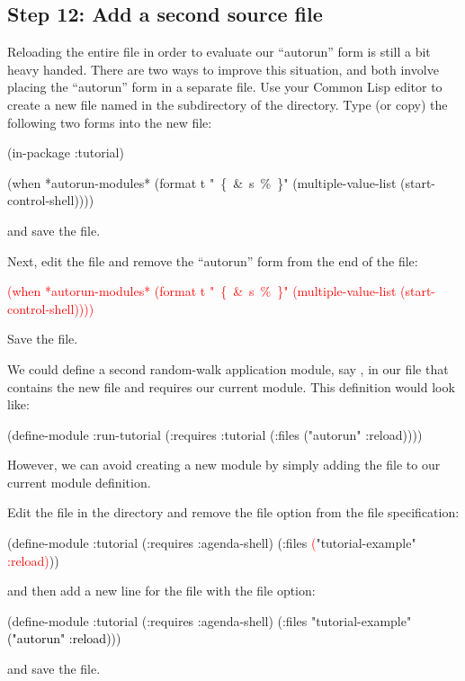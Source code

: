 \documentclass[10pt,twoside,english,pdftex]{article}
\begin{document}
\subsection*{Step 12: Add a second source file}

Reloading the entire  file in order to
evaluate our ``autorun'' form is still a bit heavy handed.  There are two ways
to improve this situation, and both involve placing the ``autorun'' form in a
separate file.  Use your Common Lisp editor to create a new file named
 in the  subdirectory of the
 directory. Type (or copy) the following two forms into the new
 file:
%
\W\supp
\begin{example}
  (in-package :tutorial)

  (when *autorun-modules*
    (format t "~\{~\&~s~\%~\}" (multiple-value-list (start-control-shell))))
\end{example}
%
and save the file.  

Next, edit the  file and remove the
``autorun'' form from the end of the file:
% 
\W\supp
\begin{example}
\textcolor{red}{%
  (when *autorun-modules* 
    (format t "~\{~\&~s~\%~\}" (multiple-value-list (start-control-shell))))}
\end{example}
%
Save the file. 

We could define a second random-walk application module, say
, in our  file that
contains the new  file and requires our current
 module.  This definition would look like:
%
\W\supp
\begin{example}
\textcolor{darkergray}{%
  (define-module :run-tutorial
    (:requires :tutorial
    (:files ("autorun" :reload))))}
\end{example}
%
However, we can avoid creating a new module by simply adding the
 file to our current  module definition.  

Edit the  file in the  directory and
remove the  file option from the 
file specification:
%
\W\supp
\begin{example}
\textcolor{darkergray}{%
  (define-module :tutorial
    (:requires :agenda-shell)
    (:files \textcolor{red}{(}"tutorial-example" \textcolor{red}{:reload)}))}
\end{example}
%
and then add a new line for the  file with the 
file option:
%
\W\supp\notpretop
\begin{example}
\textcolor{darkergray}{%
  (define-module :tutorial
    (:requires :agenda-shell)
    (:files "tutorial-example"
            \textcolor{black}{("autorun" :reload)}))}
\end{example}
%
and save the file.
\end{document}
